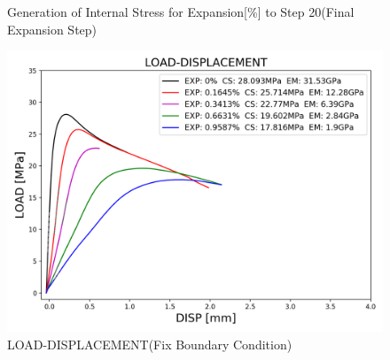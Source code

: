 \begin{figure}[ht!]
    

\caption{Generation of Internal Stress for Expansion[\%] to Step 20(Final Expansion Step)}
\label{fig:A15_stress}
\end{figure}

\begin{figure}[ht!]
    \centering
    \includegraphics[width=0.8\linewidth]{Files/exp_3D/DEF/S13A15FIXX0-LOAD-DISPLACEMENT.png}
    \caption{LOAD-DISPLACEMENT(Fix Boundary Condition)}
    \label{fig:S13A15FIXX0-LOAD-DISPLACEMENT}
\end{figure}
